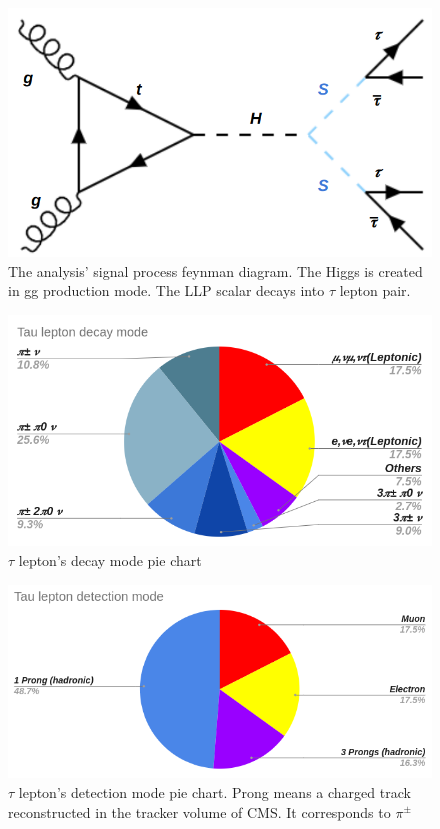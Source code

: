 \begin{figure}[h!]
  \caption{The analysis' signal process feynman diagram. The Higgs is created in gg production mode. The LLP scalar decays into $\tau$ lepton pair.}
  \label{fig:sig}
  \centering
  \includegraphics[width=0.47\linewidth]{figs/sigprocess.png}
\end{figure}


\begin{figure}[h!]
  \caption{$\tau$ lepton's decay mode pie chart}
  \label{fig:tdecay}
  \centering
  \includegraphics[width=0.87\linewidth]{figs/Taudec.png}
\end{figure}

\begin{figure}[h!]
	\caption{$\tau$ lepton's detection mode pie chart. Prong means a charged track reconstructed in the tracker volume of CMS. It corresponds to $\pi^{\pm}$}
  \label{fig:tdet}
  \centering
  \includegraphics[width=0.87\linewidth]{figs/Taudet.png}
\end{figure}


